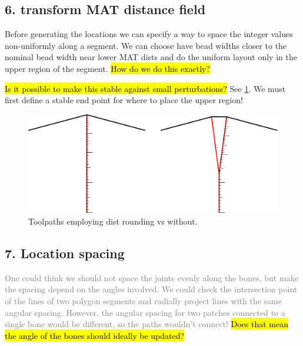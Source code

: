\subsection{6. transform MAT distance field}
Before generating the locations we can specify a way to space the integer values non-uniformly along a segment.
We can choose have bead widths closer to the nominal bead width near lower MAT dists and do the uniform layout only in the upper region of the segment.
\hl{How do we do this exactly?}

\hl{Is it possible to make this stable against small perturbations?}
See \cref{heterogeneous_joint_generation}.
We must first define a stable end point for where to place the upper region!

\begin{figure}[H]
\includegraphics[width=\columnwidth]{sources/method/heterogeneous_joint_generation.pdf}
\caption{Toolpaths employing dist rounding vs without.}
\label{heterogeneous_joint_generation}
\end{figure}






\subsection{7. Location spacing}
\textcolor{gray}{
One could think we should not space the joints evenly along the bones, but make the spacing depend on the angles involved.
We could check the intersection point of the lines of two polygon segments and radially project lines with the same angular spacing.
However, the angular spacing for two patches connected to a single bone would be different, so the paths wouldn't connect!
\hl{Does that mean the angle of the bones should ideally be updated?}
}

